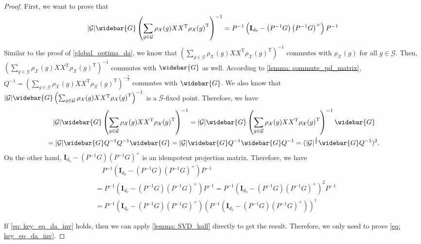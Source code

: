 \documentclass{article}
\newcommand{\T}{\mathrm{T}}
\newcommand{\G}{\mathcal{G}}
\newcommand{\X}{\mathcal{X}}
\theoremstyle{plain}
\theoremstyle{definition}
\theoremstyle{remark}
\theoremstyle{remark}
\begin{document}
  \globaloptimadainv*
  \begin{proof}
    First, we want to prove that 
    \begin{equation} \label{eq: key_eq_da_inv}
      |\G| \widebar{G} \left(\sum_{g \in \G} \rho_{\mathcal{X}}(g)XX^{\T} {\rho_{\mathcal{X}}(g)}^{\T}\right)^{-1} = P^{-1} \left(\mathbf{I}_{d_0} - \left(P^{-1} G\right) \left(P^{-1} G \right)^{+} \right) P^{-1}
    \end{equation}
    Similar to the proof of \autoref{global_optima_da}, we know that $\left(\sum_{g \in \G} \rho_{\mathcal{X}}(g)XX^{\T} {\rho_{\mathcal{X}}(g)}^{\T}\right)^{-1}$ commutes with $\rho_{\X}(g)$ for all $g \in \G$. Then, $\left(\sum_{g \in \G} \rho_{\mathcal{X}}(g)XX^{\T} {\rho_{\mathcal{X}}(g)}^{\T}\right)^{-1}$ commutes with $\widebar{G}$ as well. According to \autoref{lemma: commute_pd_matrix}, $Q^{-1} = \left(\sum_{g \in \G} \rho_{\mathcal{X}}(g)XX^{\T} {\rho_{\mathcal{X}}(g)}^{\T}\right)^{-\frac{1}{2}}$ commutes with $\widebar{G}$. We also know that $|\G| \widebar{G} \left(\sum_{g \in \G} \rho_{\mathcal{X}}(g)XX^{\T} {\rho_{\mathcal{X}}(g)}^{\T}\right)^{-1}$ is a $\G$-fixed point. Therefore, we have
    \begin{align*}
      & \quad |\G| \widebar{G} \left(\sum_{g \in \G} \rho_{\mathcal{X}}(g)XX^{\T} {\rho_{\mathcal{X}}(g)}^{\T}\right)^{-1} 
      = |\G| \widebar{G} \left(\sum_{g \in \G} \rho_{\mathcal{X}}(g)XX^{\T} {\rho_{\mathcal{X}}(g)}^{\T}\right)^{-1} \widebar{G} \\
      &= |\G| \widebar{G} Q^{-1} Q^{-1} \widebar{G} = |\G| \widebar{G} Q^{-1} \widebar{G} Q^{-1} =({|\G|}^{\frac{1}{2}}  \widebar{G} Q^{-1})^2.
    \end{align*}
    On the other hand, $\mathbf{I}_{d_0} - (P^{-1} G) (P^{-1} G)^{+}$ is an idempotent projection matrix. Therefore, we have
    \begin{align*}
      &\quad P^{-1} \left(\mathbf{I}_{d_0} - (P^{-1} G) (P^{-1} G)^{+} \right) P^{-1} \\
      &= P^{-1}\left(\mathbf{I}_{d_0} - (P^{-1} G) (P^{-1} G)^{+} \right) P^{-1} = P^{-1} \left(\mathbf{I}_{d_0} - (P^{-1} G) (P^{-1} G)^{+} \right)^2 P^{-1} \\
      &= P^{-1} \left(\mathbf{I}_{d_0} - (P^{-1} G) (P^{-1} G)^{+} \right) \left(P^{-1} \left(\mathbf{I}_{d_0} - (P^{-1} G) (P^{-1} G)^{+} \right)\right)^{\dagger}
    \end{align*}

    If \autoref{eq: key_eq_da_inv} holds, then we can apply \autoref{lemma: SVD_half} directly to get the result. Therefore, we only need to prove \autoref{eq: key_eq_da_inv}. 


\end{proof}
\end{document}
